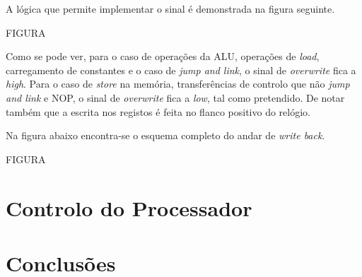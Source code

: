 \documentclass[11pt]{article}
\numberwithin{equation}{section}
\begin{document}
A lógica que permite implementar o sinal é demonstrada na figura seguinte.

FIGURA

Como se pode ver, para o caso de operações da ALU, operações de \textit{load}, carregamento de constantes e o caso de \textit{jump and link}, o sinal de \textit{overwrite} fica a \textit{high}. Para o caso de \textit{store} na memória, transferências de controlo que não \textit{jump and link} e NOP, o sinal de \textit{overwrite} fica a \textit{low}, tal como pretendido. De notar também que a escrita nos registos é feita no flanco positivo do relógio. 

Na figura abaixo encontra-se o esquema completo do andar de \textit{write back}.

FIGURA

\section{Controlo do Processador}


\section{Conclusões}

\pagebreak

\listoftodos
\end{document}
